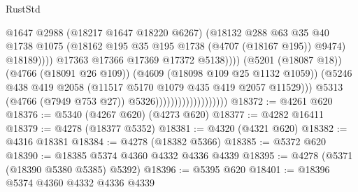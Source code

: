 \begin{lexlean}{RustStd}
\begin{coremodule}
{\begin{coremodule}
{{{{{{{{{{{{{{{{{{{{{{{{{{{{{{{{{{{                                                          @1647
                                                          @2988
                                                          (@18217 @1647 @18220 @6267)
                                                          (@18132
                                                            @288
                                                            @63
                                                            @35
                                                            @40
                                                            @1738
                                                            @1075
                                                            (@18162
                                                              @195
                                                              @35
                                                              @195
                                                              @1738
                                                              (@4707 (@18167 @195))
                                                              @9474)
                                                            @18189))))
                                                    @17363
                                                    @17366
                                                    @17369
                                                    @17372
                                                    @5138))))
                                            (@5201 (@18087 @18))
                                            (@4766 (@18091 @26 @109))
                                            (@4609 (@18098 @109 @25 @1132 @1059))
                                            (@5246
                                              @438
                                              @419
                                              @2058
                                              (@11517 @5170 @1079 @435 @419 @2057 @11529)))
                                          @5313
                                          (@4766 (@7949 @753 @27))
                                          @5326)))))))))))))))))))
@18372 := @4261 @620
@18376 := @5340 (@4267 @620) (@4273 @620)
@18377 := @4282 @16411
@18379 := @4278 (@18377 @5352)
@18381 := @4320 (@4321 @620)
@18382 := @4316 @18381
@18384 := @4278 (@18382 @5366)
@18385 := @5372 @620
@18390 := @18385 @5374 @4360 @4332 @4336 @4339
@18395 := @4278 (@5371 (@18390 @5380 @5385) @5392)
@18396 := @5395 @620
@18401 := @18396 @5374 @4360 @4332 @4336 @4339
}}}}}}}}}}}}}}}}}}}}}}}}}}}}}}}}}}}
\end{coremodule}}
\end{coremodule}
\end{lexlean}
